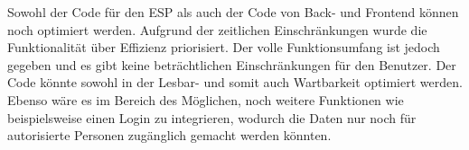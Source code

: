Sowohl der Code für den ESP als auch der Code von Back- und Frontend können noch optimiert werden.
Aufgrund der zeitlichen Einschränkungen wurde die Funktionalität über Effizienz priorisiert.
Der volle Funktionsumfang ist jedoch gegeben und es gibt keine beträchtlichen Einschränkungen für den Benutzer.
\newline
Der Code könnte sowohl in der Lesbar- und somit auch Wartbarkeit optimiert werden.
Ebenso wäre es im Bereich des Möglichen, noch weitere Funktionen wie beispielsweise einen Login zu integrieren, wodurch die Daten nur noch für autorisierte Personen zugänglich gemacht werden könnten.